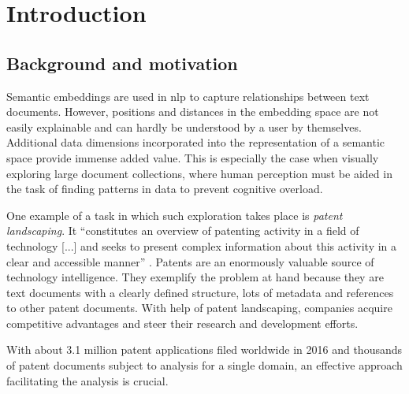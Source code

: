 
\chapter{Introduction}
\label{ch:Introduction}


\section{Background and motivation}

Semantic embeddings are used in \gls{nlp} to capture relationships between text documents. 
However, positions and distances in the embedding space are not easily explainable and can hardly be understood by a user by themselves. 
Additional data dimensions incorporated into the representation of a semantic space provide immense added value. 
This is especially the case when visually exploring large document collections, where human perception must be aided in the task of finding patterns in data to prevent cognitive overload.

One example of a task in which such exploration takes place is \textit{patent landscaping}.
It ``constitutes an overview of patenting activity in a field of technology [...] and seeks to present complex information about this activity in a clear and accessible manner'' \cite{Trippe2015}.
Patents are an enormously valuable source of technology intelligence. 
They exemplify the problem at hand because they are text documents with a clearly defined structure, lots of metadata and references to other patent documents. 
With help of patent landscaping, companies acquire competitive advantages and steer their research and development efforts.

With about 3.1 million patent applications filed worldwide in 2016 \cite{WorldIntellectualPropertyOrganizationWIPO2017} and thousands of patent documents subject to analysis for a single domain, an effective approach facilitating the analysis is crucial.

